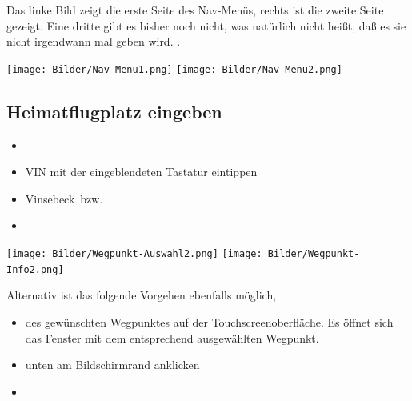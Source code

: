Das linke Bild zeigt die erste Seite des \textsf{Nav}-Menüs, rechts ist die zweite Seite gezeigt. Eine dritte gibt es bisher noch nicht, was natürlich nicht heißt, daß es sie nicht irgendwann mal geben wird. .
\begin{center}
\texttt{[image: Bilder/Nav-Menu1.png]}
\qquad
\texttt{[image: Bilder/Nav-Menu2.png]}
\end{center}

\subsection{Heimatflugplatz eingeben}\label{Heimatflugplatz}
\begin{itemize}
\item {} \blink~\blink~\blink~ 
\item \textsf{VIN} mit der eingeblendeten Tastatur eintippen  \blink~ 
\item \textsf{Vinsebeck}~\dklick bzw.\  \blink~\far
\item {}
\end{itemize}
\begin{center}
\texttt{[image: Bilder/Wegpunkt-Auswahl2.png]}\qquad%
\texttt{[image: Bilder/Wegpunkt-Info2.png]}
\end{center}
Alternativ ist das folgende Vorgehen ebenfalls möglich,
\begin{itemize}
\item \dklick des gewünschten  \textsf{Wegpunktes} auf der Touchscreenoberfläche. Es öffnet sich das Fenster  mit dem entsprechend ausgewählten Wegpunkt.
\item \far  unten am Bildschirmrand  anklicken
\item  {}
\end{itemize}
